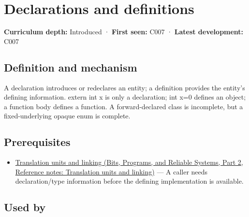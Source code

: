 \hypertarget{appendix-2e4d494c2d94}{}\label{referencestart:appendix-2e4d494c2d94}
\section{Declarations and definitions}\label{appendix-2e4d494c2d94-declarations-and-definitions}

\hypertarget{appendix-2e4d494c2d94-declarations-and-definitions}{}

\textbf{Curriculum depth:} Introduced · \textbf{First seen:} C007 · \textbf{Latest development:} C007

\begin{allmightroledefinition}

\subsection{Definition and mechanism}\label{appendix-2e4d494c2d94-definition-and-mechanism}

\hypertarget{appendix-2e4d494c2d94-definition-and-mechanism}{}

A declaration introduces or redeclares an entity; a definition provides the entity's defining information. extern int x is only a declaration; int x=0 defines an object; a function body defines a function. A forward-declared class is incomplete, but a fixed-underlying opaque enum is complete.

\end{allmightroledefinition}

\subsection{Prerequisites}\label{appendix-2e4d494c2d94-prerequisites}

\hypertarget{appendix-2e4d494c2d94-prerequisites}{}

\begin{itemize}
\tightlist
\item
  \href{../01-Bits-Programs-and-Reliable-Systems-P02/main.pdf\#nameddest=appendix-806686359e1b}{Translation units and linking (Bits, Programs, and Reliable Systems, Part 2, Reference notes: Translation units and linking)} --- A caller needs declaration/type information before the defining implementation is available.
\end{itemize}

\subsection{Used by}\label{appendix-2e4d494c2d94-used-by}

